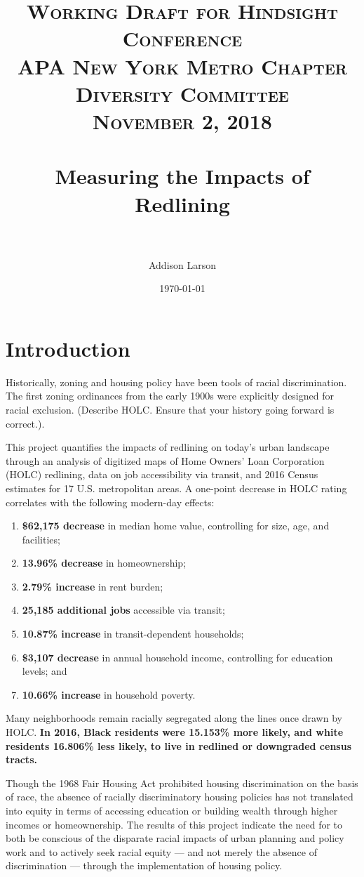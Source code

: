 \documentclass[paper=letter, fontsize=12pt]{scrartcl} %
\title{	
\normalfont \normalsize 
\textsc{Working Draft for Hindsight Conference\\APA New York Metro Chapter Diversity Committee\\November 2, 2018} \\ [6pt] %
\horrule{1pt} \\[0.5cm] %
\huge Measuring the Impacts of Redlining\\%
\horrule{1pt}\\[0.5cm] %
}
\author{Addison Larson} %
\date{\normalsize{\today}} %
\begin{document}
\maketitle %
\newpage
\tableofcontents
\newcommand{\blankpage}{
	\newpage
	\mbox{}
	\newpage
}
\listoftables
\listoffigures
\section{Introduction}
Historically, zoning and housing policy have been tools of racial discrimination. The first zoning ordinances from the early 1900s were explicitly designed for racial exclusion. (Describe HOLC. Ensure that your history going forward is correct.)\cite{rothstein}.\par
This project quantifies the impacts of redlining on today's urban landscape through an analysis of digitized maps of Home Owners' Loan Corporation (HOLC) redlining, data on job accessibility via transit, and 2016 Census estimates for 17 U.S. metropolitan areas. A one-point decrease in HOLC rating correlates with the following modern-day effects: 
\begin{enumerate}
	\item \textbf{\$62,175 decrease} in median home value, controlling for size, age, and facilities;
	\item \textbf{13.96\% decrease} in homeownership;
	\item \textbf{2.79\% increase} in rent burden;
	\item \textbf{25,185 additional jobs} accessible via transit;
	\item \textbf{10.87\% increase} in transit-dependent households;
	\item \textbf{\$3,107 decrease} in annual household income, controlling for education levels; and
	\item \textbf{10.66\% increase} in household poverty.
\end{enumerate}
Many neighborhoods remain racially segregated along the lines once drawn by HOLC. \textbf{In 2016, Black residents were 15.153\% more likely, and white residents 16.806\% less likely, to live in redlined or downgraded census tracts.}

Though the 1968 Fair Housing Act prohibited housing discrimination on the basis of race, the absence of racially discriminatory housing policies has not translated into equity in terms of accessing education or building wealth through higher incomes or homeownership. The results of this project indicate the need for to both be conscious of the disparate racial impacts of urban planning and policy work and to actively seek racial equity --- and not merely the absence of discrimination --- through the implementation of housing policy.\par
\end{document}

